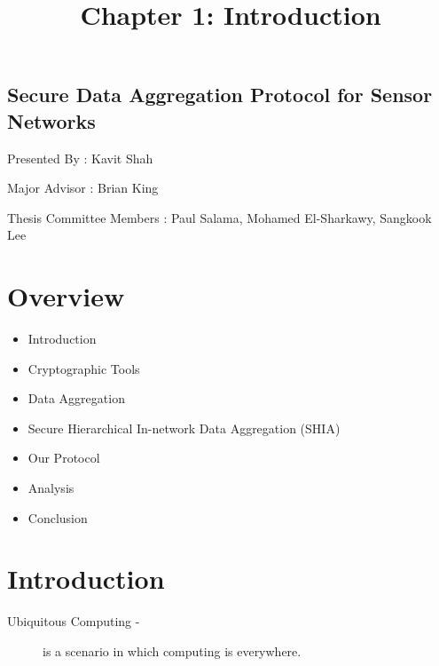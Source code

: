 \documentclass[%
  slidesonly,%
  semlayer%
  ]{seminar}                                  %
\title{Chapter 1: Introduction}
\author{}
\date{}
\date{}
\begin{document}


\maketitle          %

\begin{slide}
  \ifslidesonly              %
    \addtocounter{slide}{-1}
  \fi
\end{slide}


\begin{slide}

\footnotesize

\begin{center}
\section*{Secure Data Aggregation Protocol for Sensor Networks}
  \vfill
  Presented By : Kavit Shah

  Major Advisor : Brian King
  
  Thesis Committee Members : Paul Salama, Mohamed El-Sharkawy, Sangkook Lee
  \vfill
  \end{center}
  \clearpage

\section*{Overview}
  \vfill
  \begin{center}
    \begin{itemize}
      \item Introduction
      \item Cryptographic Tools
      \item Data Aggregation
      \item Secure Hierarchical In-network Data Aggregation (SHIA)
      \item Our Protocol
      \item Analysis
      \item Conclusion
    \end{itemize}
  \end{center}
  \vfill
  \clearpage

\section*{Introduction}
  \vfill
  \begin{description}
    \item[Ubiquitous Computing -] is a scenario in which computing is everywhere.


\end{description}
\end{slide}
\end{document}
